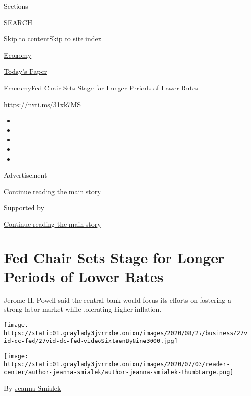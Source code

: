 Sections

SEARCH

\protect\hyperlink{site-content}{Skip to
content}\protect\hyperlink{site-index}{Skip to site index}

\href{https://www.nytimes3xbfgragh.onion/section/business/economy}{Economy}

\href{https://myaccount.nytimes3xbfgragh.onion/auth/login?response_type=cookie\&client_id=vi}{}

\href{https://www.nytimes3xbfgragh.onion/section/todayspaper}{Today's
Paper}

\href{/section/business/economy}{Economy}\textbar{}Fed Chair Sets Stage
for Longer Periods of Lower Rates

\url{https://nyti.ms/31xk7MS}

\begin{itemize}
\item
\item
\item
\item
\item
\end{itemize}

Advertisement

\protect\hyperlink{after-top}{Continue reading the main story}

Supported by

\protect\hyperlink{after-sponsor}{Continue reading the main story}

\hypertarget{fed-chair-sets-stage-for-longer-periods-of-lower-rates}{%
\section{Fed Chair Sets Stage for Longer Periods of Lower
Rates}\label{fed-chair-sets-stage-for-longer-periods-of-lower-rates}}

Jerome H. Powell said the central bank would focus its efforts on
fostering a strong labor market while tolerating higher inflation.

\texttt{[image: https://static01.graylady3jvrrxbe.onion/images/2020/08/27/business/27vid-dc-fed/27vid-dc-fed-videoSixteenByNine3000.jpg]}

\href{https://www.nytimes3xbfgragh.onion/by/jeanna-smialek}{\texttt{[image: https://static01.graylady3jvrrxbe.onion/images/2020/07/03/reader-center/author-jeanna-smialek/author-jeanna-smialek-thumbLarge.png]}}

By \href{https://www.nytimes3xbfgragh.onion/by/jeanna-smialek}{Jeanna
Smialek}

